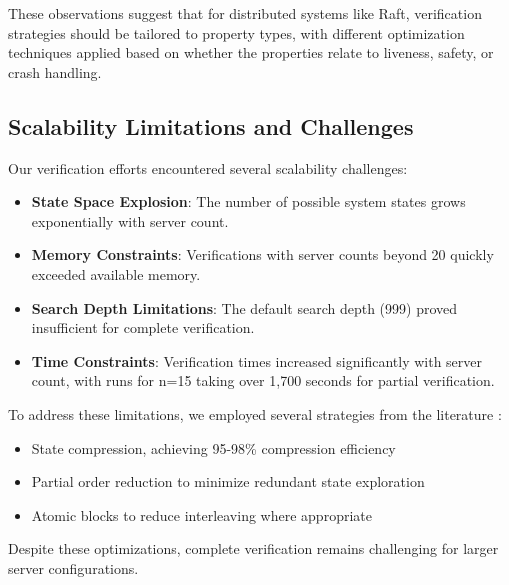 \documentclass[a4paper]{llncs}
\begin{document}
These observations suggest that for distributed systems like Raft, verification strategies should be tailored to property types, with different optimization techniques applied based on whether the properties relate to liveness, safety, or crash handling.

\subsection{Scalability Limitations and Challenges}
\label{sec:scalability}

Our verification efforts encountered several scalability challenges:

\begin{itemize}
    \item \textbf{State Space Explosion}: The number of possible system states grows exponentially with server count.
    
    \item \textbf{Memory Constraints}: Verifications with server counts beyond 20 quickly exceeded available memory.
    
    \item \textbf{Search Depth Limitations}: The default search depth (999) proved insufficient for complete verification.
    
    \item \textbf{Time Constraints}: Verification times increased significantly with server count, with runs for n=15 taking over 1,700 seconds for partial verification.
\end{itemize}

To address these limitations, we employed several strategies from the literature \cite{Holzmann97, Garavel}:
\begin{itemize}
    \item State compression, achieving 95-98\% compression efficiency
    \item Partial order reduction to minimize redundant state exploration
    \item Atomic blocks to reduce interleaving where appropriate
\end{itemize}

Despite these optimizations, complete verification remains challenging for larger server configurations.
\end{document}
